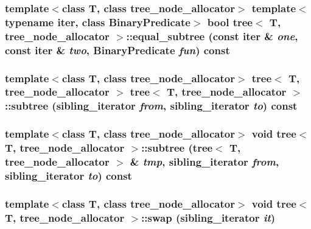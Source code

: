 \hypertarget{classtree_5e8445150c43058416d16b4846ff0f15}{
\subsubsection{\setlength{\rightskip}{0pt plus 5cm}template$<$class T, class tree\_\-node\_\-allocator$>$ template$<$typename iter, class BinaryPredicate$>$ bool {\bf tree}$<$ T, tree\_\-node\_\-allocator $>$::equal\_\-subtree (const iter \& {\em one}, \/  const iter \& {\em two}, \/  BinaryPredicate {\em fun}) const}}
\label{classtree_5e8445150c43058416d16b4846ff0f15}


\hypertarget{classtree_db61bebed6c56eb5641b0b7fab7fe625}{
\subsubsection{\setlength{\rightskip}{0pt plus 5cm}template$<$class T, class tree\_\-node\_\-allocator$>$ {\bf tree}$<$ T, tree\_\-node\_\-allocator $>$ {\bf tree}$<$ T, tree\_\-node\_\-allocator $>$::subtree ({\bf sibling\_\-iterator} {\em from}, \/  {\bf sibling\_\-iterator} {\em to}) const}}
\label{classtree_db61bebed6c56eb5641b0b7fab7fe625}


\hypertarget{classtree_830cccac50df183c44c6ff83cab5a27f}{
\subsubsection{\setlength{\rightskip}{0pt plus 5cm}template$<$class T, class tree\_\-node\_\-allocator$>$ void {\bf tree}$<$ T, tree\_\-node\_\-allocator $>$::subtree ({\bf tree}$<$ T, tree\_\-node\_\-allocator $>$ \& {\em tmp}, \/  {\bf sibling\_\-iterator} {\em from}, \/  {\bf sibling\_\-iterator} {\em to}) const}}
\label{classtree_830cccac50df183c44c6ff83cab5a27f}


\hypertarget{classtree_e842f9b70235bc2412b3c43bca759448}{
\subsubsection{\setlength{\rightskip}{0pt plus 5cm}template$<$class T, class tree\_\-node\_\-allocator$>$ void {\bf tree}$<$ T, tree\_\-node\_\-allocator $>$::swap ({\bf sibling\_\-iterator} {\em it})}}
\label{classtree_e842f9b70235bc2412b3c43bca759448}


